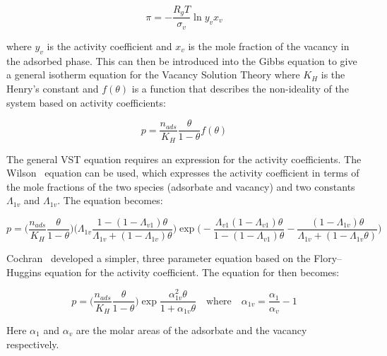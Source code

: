 \begin{equation}
	\pi = - \frac{R_g T}{\sigma_v} \ln{y_v x_v}
\end{equation}

where \(y_v\) is the activity coefficient and  \(x_v\) is the mole
fraction of
the vacancy in the adsorbed phase.
This can then be introduced into the Gibbs equation to give a general
isotherm equation
for the Vacancy Solution Theory where \(K_H\) is the Henry’s constant
and
\(f(\theta)\) is a function that describes the non-ideality of the
system based
on activity coefficients:

\begin{equation}
	p = \frac{n_{ads}}{K_H} \frac{\theta}{1-\theta} f(\theta)
\end{equation}

The general VST equation requires an expression for the activity
coefficients.
The Wilson~\cite{suwanayuenGasAdsorptionIsotherm1980} equation can be
used,
which expresses the activity coefficient in terms
of the mole fractions of the two species (adsorbate and vacancy) and
two constants
\(\Lambda_{1v}\) and \(\Lambda_{1v}\). The equation becomes:

\begin{equation}\label{pyg:eqn:wvst}
	p = \bigg( \frac{n_{ads}}{K_H} \frac{\theta}{1-\theta} \bigg)
	\bigg( \Lambda_{1v}
	\frac{1-(1-\Lambda_{v1})\theta}{\Lambda_{1v}+(1-\Lambda_{1v})\theta}
	\bigg)
	\exp{\bigg(
		-\frac{\Lambda_{v1}(1-\Lambda_{v1})\theta}{1-(1-\Lambda_{v1})\theta}
		-\frac{(1 - \Lambda_{1v})\theta}{\Lambda_{1v} +
			(1-\Lambda_{1v}\theta)} \bigg)}
\end{equation}

Cochran~\cite{cochranVacancySolutionTheory1985}
developed a simpler, three parameter equation based on
the Flory–Huggins equation for the activity coefficient.
The equation for then becomes:

\begin{equation}\label{pyg:eqn:fhvst}
	p = \bigg( \frac{n_{ads}}{K_H} \frac{\theta}{1-\theta} \bigg)
	\exp{\frac{\alpha^2_{1v}\theta}{1+\alpha_{1v}\theta}}
	\quad \text{where} \quad
	\alpha_{1v} = \frac{\alpha_{1}}{\alpha_{v}} - 1
\end{equation}

Here \(\alpha_{1}\) and \(\alpha_{v}\) are the molar areas of the
adsorbate
and the vacancy respectively.

